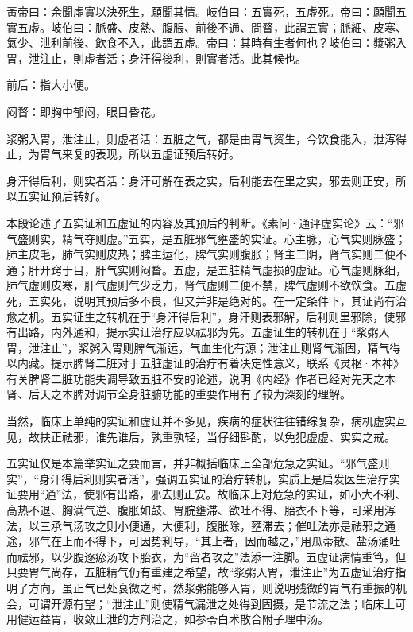 \documentclass[draft,12pt]{ctexbook}
\begin{document}

\begin{yuanwen}
黃帝曰：余聞虛實以決死生，願聞其情。岐伯曰：五實死，五虛死。帝曰：願聞五實五虛。岐伯曰：脈盛、皮熱、腹脹、前後不通、問瞀，此謂五實；脈細、皮寒、氣少、泄利前後、飲食不入，此謂五虛。帝曰：其時有生者何也？岐伯曰：漿粥入胃，泄注止，則虛者活；身汗得後利，則實者活。此其候也。
\end{yuanwen}


\begin{jiaozhu}
  \item 前后：指大小便。
  \item 闷瞀：即胸中郁闷，眼目昏花。
  \item 浆粥入胃，泄注止，则虚者活：五脏之气，都是由胃气资生，今饮食能入，泄泻得止，为胃气来复的表现，所以五虚证预后转好。
  \item 身汗得后利，则实者活：身汗可解在表之实，后利能去在里之实，邪去则正安，所以五实证预后转好。
\end{jiaozhu}



本段论述了五实证和五虚证的内容及其预后的判断。《素问·通评虚实论》云：“邪气盛则实，精气夺则虚。”五实，是五脏邪气壅盛的实证。心主脉，心气实则脉盛；肺主皮毛，肺气实则皮热；脾主运化，脾气实则腹胀；肾主二阴，肾气实则二便不通；肝开窍于目，肝气实则闷瞀。五虚，是五脏精气虚损的虚证。心气虚则脉细，肺气虚则皮寒，肝气虚则气少乏力，肾气虚则二便不禁，脾气虚则不欲饮食。五虚死，五实死，说明其预后多不良，但又并非是绝对的。在一定条件下，其证尚有治愈之机。五实证生之转机在于“身汗得后利”，身汗则表邪解，后利则里邪除，使邪有出路，内外通和，提示实证治疗应以祛邪为先。五虚证生的转机在于“浆粥入胃，泄注止”，浆粥入胃则脾气渐运，气血生化有源；泄注止则肾气渐固，精气得以内藏。提示脾肾二脏对于五脏虚证的治疗有着决定性意义，联系《灵枢·本神》有关脾肾二脏功能失调导致五脏不安的论述，说明《内经》作者已经对先天之本肾、后天之本脾对调节全身脏腑功能的重要作用有了较为深刻的理解。

当然，临床上单纯的实证和虚证并不多见，疾病的症状往往错综复杂，病机虚实互见，故扶正祛邪，谁先谁后，孰重孰轻，当仔细斟酌，以免犯虚虚、实实之戒。



五实证仅是本篇举实证之要而言，并非概括临床上全部危急之实证。“邪气盛则实”，“身汗得后利则实者活”，强调五实证的治疗转机，实质上是启发医生治疗实证要用“通”法，使邪有出路，邪去则正安。故临床上对危急的实证，如小大不利、高热不退、胸满气逆、腹胀如鼓、胃脘壅滞、欲吐不得、胎衣不下等，可采用泻法，以三承气汤攻之则小便通，大便利，腹胀除，壅滞去；催吐法亦是祛邪之通途，邪气在上而不得下，可因势利导，“其上者，因而越之，”用瓜蒂散、盐汤涌吐而祛邪，以少腹逐瘀汤攻下胎衣，为“留者攻之”法添一注脚。五虚证病情重笃，但只要胃气尚存，五脏精气仍有重建之希望，故“浆粥入胃，泄注止”为五虚证治疗指明了方向，虽正气已处衰微之时，然浆粥能够入胃，则说明残微的胃气有重振的机会，可谓开源有望；“泄注止”则使精气漏泄之处得到固摄，是节流之法；临床上可用健运益胃，收敛止泄的方剂治之，如参苓白术散合附子理中汤。
\end{document}
